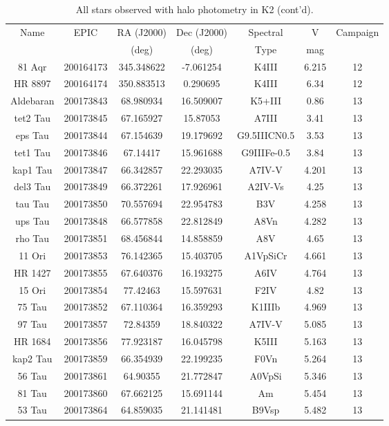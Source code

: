 \begin{table*}
\caption{All stars observed with halo photometry in K2 (cont'd).}
\begin{tabular}{ccccccc}
\hline \hline
Name & EPIC & RA (J2000) & Dec (J2000) & Spectral & V & Campaign \\
 &  & (deg) & (deg) & Type & mag &  \\
\hline
81 Aqr & 200164173 & 345.348622 & -7.061254 & K4III & 6.215 & 12 \\
HR 8897 & 200164174 & 350.883513 & 0.290695 & K4III & 6.34 & 12 \\
Aldebaran & 200173843 & 68.980934 & 16.509007 & K5+III & 0.86 & 13 \\
tet2 Tau & 200173845 & 67.165927 & 15.87053 & A7III & 3.41 & 13 \\
eps Tau & 200173844 & 67.154639 & 19.179692 & G9.5IIICN0.5 & 3.53 & 13 \\
tet1 Tau & 200173846 & 67.14417 & 15.961688 & G9IIIFe-0.5 & 3.84 & 13 \\
kap1 Tau & 200173847 & 66.342857 & 22.293035 & A7IV-V & 4.201 & 13 \\
del3 Tau & 200173849 & 66.372261 & 17.926961 & A2IV-Vs & 4.25 & 13 \\
tau Tau & 200173850 & 70.557694 & 22.954783 & B3V & 4.258 & 13 \\
ups Tau & 200173848 & 66.577858 & 22.812849 & A8Vn & 4.282 & 13 \\
rho Tau & 200173851 & 68.456844 & 14.858859 & A8V & 4.65 & 13 \\
11 Ori & 200173853 & 76.142365 & 15.403705 & A1VpSiCr & 4.661 & 13 \\
HR 1427 & 200173855 & 67.640376 & 16.193275 & A6IV & 4.764 & 13 \\
15 Ori & 200173854 & 77.42463 & 15.597631 & F2IV & 4.82 & 13 \\
75 Tau & 200173852 & 67.110364 & 16.359293 & K1IIIb & 4.969 & 13 \\
97 Tau & 200173857 & 72.84359 & 18.840322 & A7IV-V & 5.085 & 13 \\
HR 1684 & 200173856 & 77.923187 & 16.045798 & K5III & 5.163 & 13 \\
kap2 Tau & 200173859 & 66.354939 & 22.199235 & F0Vn & 5.264 & 13 \\
56 Tau & 200173861 & 64.90355 & 21.772847 & A0VpSi & 5.346 & 13 \\
81 Tau & 200173860 & 67.662125 & 15.691144 & Am & 5.454 & 13 \\
53 Tau & 200173864 & 64.859035 & 21.141481 & B9Vsp & 5.482 & 13 \\

\end{tabular}
\end{table*}

